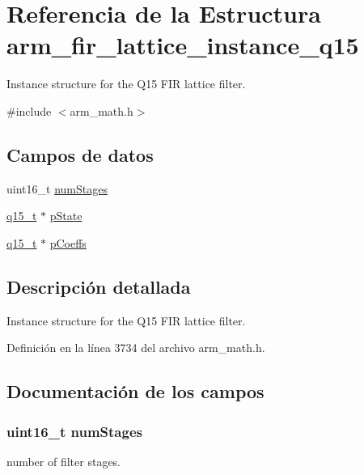 \hypertarget{structarm__fir__lattice__instance__q15}{}\section{Referencia de la Estructura arm\+\_\+fir\+\_\+lattice\+\_\+instance\+\_\+q15}
\label{structarm__fir__lattice__instance__q15}


Instance structure for the Q15 F\+IR lattice filter.  




{\ttfamily \#include $<$arm\+\_\+math.\+h$>$}

\subsection*{Campos de datos}
\begin{DoxyCompactItemize}
\item 
uint16\+\_\+t \hyperlink{structarm__fir__lattice__instance__q15_a4cceb90547b3e585d4c7aabaa8057212}{num\+Stages}
\item 
\hyperlink{arm__math_8h_ab5a8fb21a5b3b983d5f54f31614052ea}{q15\+\_\+t} $\ast$ \hyperlink{structarm__fir__lattice__instance__q15_ae29dfdb736374fcddaeaec4b7770170c}{p\+State}
\item 
\hyperlink{arm__math_8h_ab5a8fb21a5b3b983d5f54f31614052ea}{q15\+\_\+t} $\ast$ \hyperlink{structarm__fir__lattice__instance__q15_a7ca181a37f714d174445f486bebce26f}{p\+Coeffs}
\end{DoxyCompactItemize}


\subsection{Descripción detallada}
Instance structure for the Q15 F\+IR lattice filter. 

Definición en la línea 3734 del archivo arm\+\_\+math.\+h.



\subsection{Documentación de los campos}
\subsubsection[{\texorpdfstring{num\+Stages}{numStages}}]{\setlength{\rightskip}{0pt plus 5cm}uint16\+\_\+t num\+Stages}\hypertarget{structarm__fir__lattice__instance__q15_a4cceb90547b3e585d4c7aabaa8057212}{}\label{structarm__fir__lattice__instance__q15_a4cceb90547b3e585d4c7aabaa8057212}
number of filter stages. 

